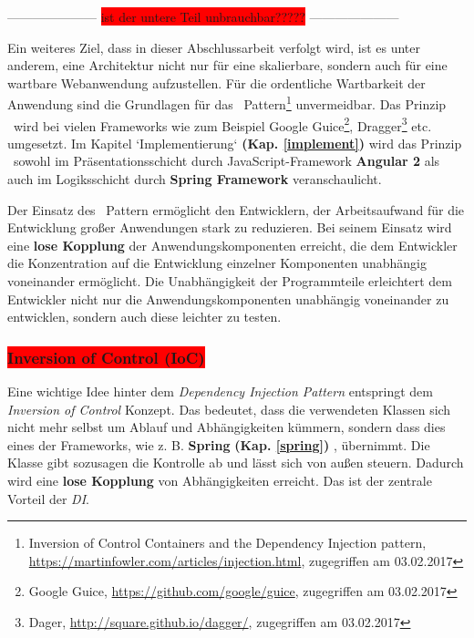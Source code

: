 ---------------------
\colorbox{red}{ist der untere Teil unbrauchbar?????}
---------------------

Ein weiteres Ziel, dass in dieser Abschlussarbeit verfolgt wird, ist es unter anderem, eine Architektur nicht nur für eine skalierbare, sondern auch für eine wartbare Webanwendung aufzustellen. Für die ordentliche Wartbarkeit der Anwendung sind die Grundlagen für das \di\ Pattern\footnote{Inversion of Control Containers and the Dependency Injection pattern, \url{https://martinfowler.com/articles/injection.html}, zugegriffen am 03.02.2017} unvermeidbar. Das Prinzip \di\ wird bei vielen Frameworks wie zum Beispiel Google Guice\footnote{Google Guice, \url{https://github.com/google/guice}, zugegriffen am 03.02.2017}, Dragger\footnote{Dager, \url{http://square.github.io/dagger/}, zugegriffen am 03.02.2017} etc. umgesetzt. Im Kapitel `Implementierung` \textbf{(Kap. \ref{implement})} wird das Prinzip \di\ sowohl im Präsentationsschicht durch JavaScript-Framework \textbf{Angular 2} als auch im Logiksschicht durch \textbf{Spring Framework} veranschaulicht.

Der Einsatz des \di\ Pattern ermöglicht den Entwicklern, der Arbeitsaufwand für die Entwicklung großer Anwendungen stark zu reduzieren. Bei seinem Einsatz wird eine \textbf{lose Kopplung} der Anwendungskomponenten erreicht, die dem Entwickler die Konzentration auf die Entwicklung einzelner Komponenten unabhängig voneinander ermöglicht. Die Unabhängigkeit der Programmteile erleichtert dem Entwickler nicht nur die Anwendungskomponenten unabhängig voneinander zu entwicklen, sondern auch diese leichter zu testen. 

\subsubsection{\colorbox{red}{Inversion of Control (IoC)}}

Eine wichtige Idee hinter dem \textit{Dependency Injection Pattern} entspringt dem \textit{Inversion of Control} Konzept. Das bedeutet, dass die verwendeten Klassen sich nicht mehr selbst um Ablauf und Abhängigkeiten kümmern, sondern dass dies eines der Frameworks, wie z. B. \textbf{Spring} \textbf{(Kap. \ref{spring})} , übernimmt. Die Klasse gibt sozusagen die Kontrolle ab und lässt sich von außen steuern. Dadurch wird eine \textbf{lose Kopplung} von Abhängigkeiten erreicht. Das ist der zentrale Vorteil der \textit{DI}.

